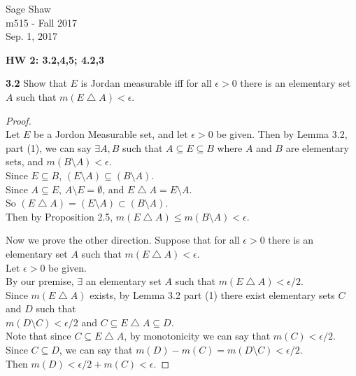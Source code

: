 \documentclass[12pt]{article}
\begin{document}
	\thispagestyle{empty}
	
\begin{flushright}
	Sage Shaw \\
	m515 - Fall 2017 \\
	Sep. 1, 2017
\end{flushright}
	
{\large \textbf{HW 2: 3.2,4,5; 4.2,3}}\bigbreak

\hspace{-4 ex}\textbf{3.2} Show that $E$ is Jordan measurable iff for all $\epsilon>0$ there is an elementary set $A$ such that $m(E\bigtriangleup A)<\epsilon$. \bigbreak

	\begin{proof}\text{ }\\
		Let $E$ be a Jordon Measurable set, and let $\epsilon >0$ be given. Then by Lemma 3.2, part (1), we can say $\exists A,B$ such that $A \subseteq E \subseteq B$ where $A$ and $B$ are elementary sets, and $m(B\setminus A)< \epsilon$. \\
		Since $E \subseteq B$, $(E \setminus A) \subseteq (B \setminus A)$. \\
		Since $A \subseteq E$, $A \setminus E = \emptyset$, and $E \bigtriangleup A = E \setminus A$. \\ 
		So $(E \bigtriangleup A) = (E \setminus A) \subset (B \setminus A)$.\\
		Then by Proposition 2.5, $m(E \bigtriangleup A) \leq m(B \setminus A) < \epsilon$.\bigbreak
		
		Now we prove the other direction. Suppose that for all $\epsilon>0$ there is an elementary set $A$ such that $m(E\bigtriangleup A)<\epsilon$.\\
		
		Let $\epsilon > 0$ be given. \\
		By our premise, $\exists $ an elementary set $A$ such that $m(E\bigtriangleup A)<\epsilon / 2$. \\
		Since $m(E \bigtriangleup A)$ exists, by Lemma 3.2 part (1) there exist elementary sets $C$ and $D$ such that \\
		$m(D \setminus C) < \epsilon/2$ and $C \subseteq E \bigtriangleup A \subseteq D$. \\
		Note that since $C \subseteq E \bigtriangleup A$, by monotonicity we can say that $m(C) < \epsilon/2$. \\
		Since $C \subseteq D$, we can say that $m(D)-m(C) = m(D \setminus C) < \epsilon/2$. \\
		Then $m(D) < \epsilon/2 + m(C) < \epsilon$. \bigbreak
		

\end{proof}
\end{document}
